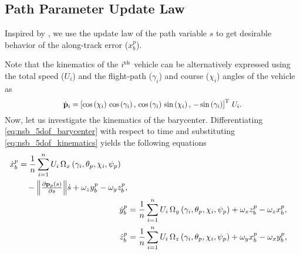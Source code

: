 \subsection{Path Parameter Update Law}
\label{sec:nsb_5dof_path_parameter}
Inspired by \cite{belleter_2019_observer}, we use the update law of the path variable $s$ to get desirable behavior of the along-track error ($x_b^p$).

Note that the kinematics of the $i^{\rm th}$ vehicle can be alternatively expressed using the total speed ($U_i$) and the flight-path ($\gamma_i$) and course ($\chi_i$) angles of the vehicle as
\begin{equation}
    \scale[0.91]{\dot{\mat{p}}_i = \left[\cos\left(\chi_i\right)\,\cos\left(\gamma_i\right) ,\, \cos\left(\gamma_i\right)\,\sin\left(\chi_i\right) ,\, -\sin\left(\gamma_i\right)\right]\T \, U_i.} \label{eq:nsb_5dof_kinematics}
\end{equation}
Now, let us investigate the kinematics of the barycenter.
Differentiating \eqref{eq:nsb_5dof_barycenter} with respect to time and substituting \eqref{eq:nsb_5dof_kinematics} yields the following equations
\begin{subequations}
    \begin{align}
        \begin{split}
            \dot{x}_b^p &= \frac{1}{n}\sum_{i=1}^n U_i\,\Omega_x\left(\gamma_i, \theta_p, \chi_i, \psi_p\right) \\
            &\quad - \scale{\norm{\frac{\partial \mat{p}_p(s)}{\partial s}}}\dot{s} + \omega_zy_b^p - \omega_yz_b^p,
        \end{split} \label{eq:nsb_5dof_x_pb} \\
        \dot{y}_b^p &= \frac{1}{n}\sum_{i=1}^n U_i\,\Omega_y\left(\gamma_i, \theta_p, \chi_i, \psi_p\right) + \omega_xz_b^p - \omega_zx_b^p, \label{eq:nsb_5dof_y_pb} \\
        \dot{z}_b^p &= \frac{1}{n}\sum_{i=1}^n U_i\,\Omega_z\left(\gamma_i, \theta_p, \chi_i, \psi_p\right) + \omega_yx_b^p - \omega_xy_b^p, \label{eq:nsb_5dof_z_pb}
    \end{align} \label{eq:nsb_5dof_barycenter_kinematics}
\end{subequations}
